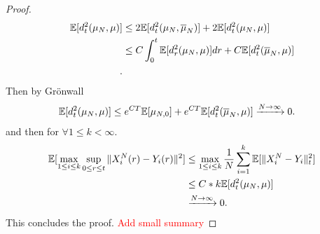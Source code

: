 \begin{proof}
\begin{align*}
    \mathbb{E}[d_t^2(\mu_N,\mu )] &\le  2 \mathbb{E}[d_t^2(\mu_N,\overline{\mu }_N )] + 2 \mathbb{E}[d_t^2(\mu_N,\mu )]\\
                          &\le  C \int_0^{t} \mathbb{E}[d_r^2(\mu_N,\mu )] dr + C\mathbb{E}[d_t^2(\overline{\mu}_N,\mu )] \\
  .\end{align*}
  Then by Grönwall 
  \begin{align*}
    \mathbb{E}[d_t^2(\mu_N,\mu )] &\le e^{CT} \mathbb{E}[\mu_{N,0}] + e^{CT} \mathbb{E}[d_t^2(\overline{\mu }_N,\mu  )] \xrightarrow{N\to \infty} 0 
  .\end{align*}
  and then for $\forall  1\le k < \infty$. 
  \begin{align*}
    \mathbb{E}[\max_{1\le i \le  k}\sup_{0\le r\le t} \|X_i^{N}(r) - Y_i(r) \|^2] &\le \max_{1 \le i\le k} \frac{1}{N}\sum_{i=1}^{k} \mathbb{E}[\|X_i^{N}-Y_i \|_t^2] \\
                                                                          &\le  C*k\mathbb{E}[d_t^2(\mu_N,\mu   )]\\
                                                                          &\xrightarrow{N\to \infty} 0
  .\end{align*}
  This concludes the proof. \textcolor{Red}{Add small summary}
\end{proof}
